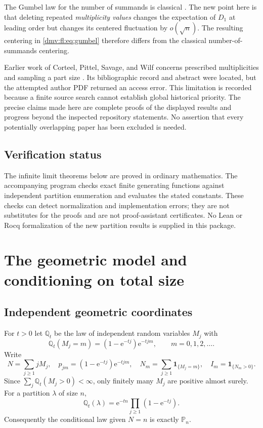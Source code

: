 \documentclass[11pt,letterpaper]{article}
\numberwithin{equation}{section}
\theoremstyle{definition}\newtheorem{definition}[theorem]{Definition}
\theoremstyle{remark}\newtheorem{remark}[theorem]{Remark}
\newcommand{\ee}{\mathrm e}
\newcommand{\Pp}{\mathbb P}
\newcommand{\Q}{\mathbb Q}
\newcommand{\ind}{\mathbf 1}
\begin{document}
The Gumbel law for the number of summands is classical
\cite{erdoslehner}. The new point here is that deleting repeated
\emph{multiplicity values} changes the expectation of $D_1$ at leading
order but changes its centered fluctuation by $o(\sqrt n)$.
The resulting centering in \eqref{dmv:fl:eq:gumbel} therefore differs from the
classical number-of-summands centering.

Earlier work of Corteel, Pittel, Savage, and Wilf concerns prescribed
multiplicities and sampling a part size \cite{cpsw}. Its bibliographic
record and abstract were located, but the attempted author PDF returned
an access error. This limitation is recorded because a finite source
search cannot establish global historical priority. The precise claims
made here are complete proofs of the displayed results and progress
beyond the inspected repository statements. No assertion that every
potentially overlapping paper has been excluded is needed.

\subsection{Verification status}
The infinite limit theorems below are proved in ordinary mathematics.
The accompanying program checks exact finite generating functions against
independent partition enumeration and evaluates the stated constants.
These checks can detect normalization and implementation errors; they
are not substitutes for the proofs and are not proof-assistant
certificates. No Lean or Rocq formalization of the new partition results
is supplied in this package.
\section{The geometric model and conditioning on total size}\label{dmv:fl:sec:conditioning}

\subsection{Independent geometric coordinates}
For $t>0$ let $\Q_t$ be the law of independent random variables $M_j$ with
\begin{equation}\label{dmv:fl:eq:geometric}
 \Q_t(M_j=m)=(1-\ee^{-tj})\ee^{-tjm},\qquad m=0,1,2,\ldots.
\end{equation}
Write
\[
 N=\sum_{j\ge1}jM_j,\quad
 p_{jm}=(1-\ee^{-tj})\ee^{-tjm},\quad
 N_m=\sum_{j\ge1}\ind_{\{M_j=m\}},\quad I_m=\ind_{\{N_m>0\}}.
\]
Since $\sum_j\Q_t(M_j>0)<\infty$, only finitely many $M_j$ are positive
almost surely. For a partition $\lambda$ of size $n$,
\[
 \Q_t(\lambda)=\ee^{-tn}\prod_{j\ge1}(1-\ee^{-tj}).
\]
Consequently the conditional law given $N=n$ is exactly $\Pp_n$.
\end{document}
